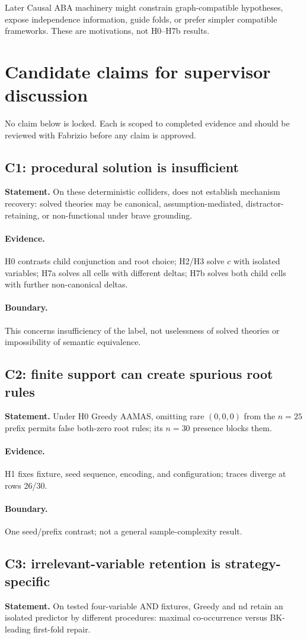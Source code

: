 \documentclass[11pt]{article}
\DeclareRobustCommand{\code}[1]{\texttt{\detokenize{#1}}}
\newcommand{\evidence}{\paragraph{Evidence.}}
\newcommand{\boundary}{\paragraph{Boundary.}}
\begin{document}
Later Causal ABA machinery might constrain graph-compatible hypotheses, expose
independence information, guide folds, or prefer simpler compatible
frameworks. These are motivations, not H0--H7b results.

\section{Candidate claims for supervisor discussion}

No claim below is locked. Each is scoped to completed evidence and should be
reviewed with Fabrizio before any claim is approved.

\subsection*{C1: procedural solution is insufficient}
\textbf{Statement.} On these deterministic colliders, \code{solved} does not
establish mechanism recovery: solved theories may be canonical,
assumption-mediated, distractor-retaining, or non-functional under brave
grounding.

\evidence H0 contrasts child conjunction and root choice; H2/H3 solve \(c\)
with isolated variables; H7a solves all cells with different deltas; H7b
solves both child cells with further non-canonical deltas.

\boundary This concerns insufficiency of the label, not uselessness of solved
theories or impossibility of semantic equivalence.

\subsection*{C2: finite support can create spurious root rules}
\textbf{Statement.} Under H0 Greedy AAMAS, omitting rare \((0,0,0)\) from the
\(n=25\) prefix permits false both-zero root rules; its \(n=30\) presence
blocks them.

\evidence H1 fixes fixture, seed sequence, encoding, and configuration; traces
diverge at rows 26/30.

\boundary One seed/prefix contrast; not a general sample-complexity result.

\subsection*{C3: irrelevant-variable retention is strategy-specific}
\textbf{Statement.} On tested four-variable AND fixtures, Greedy and nd retain
an isolated predictor by different procedures: maximal co-occurrence versus
BK-leading first-fold repair.
\end{document}
